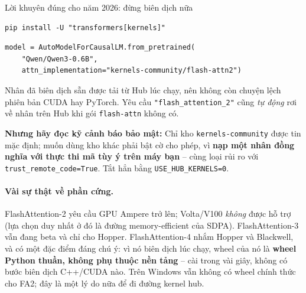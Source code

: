 \begin{assess}{Lời khuyên đúng cho năm 2026: đừng biên dịch nữa}
\begin{verbatim}
pip install -U "transformers[kernels]"
\end{verbatim}
\begin{verbatim}
model = AutoModelForCausalLM.from_pretrained(
    "Qwen/Qwen3-0.6B",
    attn_implementation="kernels-community/flash-attn2")
\end{verbatim}
Nhân đã biên dịch sẵn được tải từ Hub lúc chạy, nên không còn chuyện lệch phiên bản CUDA hay PyTorch. Yêu cầu \texttt{"flash\_attention\_2"} cũng \emph{tự động} rơi về nhân trên Hub khi gói \texttt{flash-attn} không có.

\textbf{Nhưng hãy đọc kỹ cảnh báo bảo mật:} Chỉ kho \texttt{kernels-community} được tin mặc định; muốn dùng kho khác phải bật cờ cho phép, vì \textbf{nạp một nhân đồng nghĩa với thực thi mã tùy ý trên máy bạn} -- cùng loại rủi ro với \texttt{trust\_\allowbreak remote\_\allowbreak code=True}. Tắt hẳn bằng \texttt{USE\_HUB\_KERNELS=0}.
\end{assess}

\paragraph{Vài sự thật về phần cứng.} FlashAttention-2 yêu cầu GPU Ampere trở lên; Volta/V100 \emph{không} được hỗ trợ (lựa chọn duy nhất ở đó là đường memory-efficient của SDPA). FlashAttention-3 vẫn đang beta và chỉ cho Hopper. FlashAttention-4 nhắm Hopper và Blackwell, và có một đặc điểm đáng chú ý: vì nó biên dịch lúc chạy, wheel của nó là \textbf{wheel Python thuần, không phụ thuộc nền tảng} -- cài trong vài giây, không có bước biên dịch C++/CUDA nào. Trên Windows vẫn không có wheel chính thức cho FA2; đây là một lý do nữa để đi đường kernel hub.

